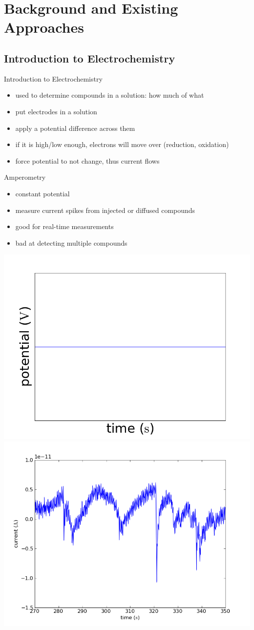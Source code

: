 \documentclass[10pt]{beamer}
\begin{document}
\section{Background and Existing Approaches}
\subsection{Introduction to Electrochemistry}
\begin{frame}{Introduction to Electrochemistry}
	\begin{itemize}
		\item used to determine compounds in a solution: how much of what
		\item put electrodes in a solution
		\item apply a potential difference across them
		\item if it is high/low enough, electrons will move over (reduction, oxidation)
		\item force potential to not change, thus current flows
	\end{itemize}
\end{frame}

\begin{frame}{Amperometry}
	\begin{itemize}
		\item constant potential
		\item measure current spikes from injected or diffused compounds
		\item good for real-time measurements
		\item bad at detecting multiple compounds
	\end{itemize}
	\includegraphics[width=0.5\linewidth]{figures/amperometry.png}
	\includegraphics[width=0.5\linewidth]{figures/216.png}
\end{frame}
\end{document}
